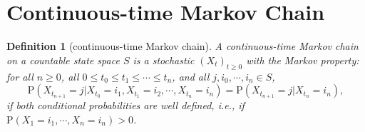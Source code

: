 \documentclass{report}
\newtheorem{definition}{Definition}[section]
\theoremstyle{nonumberplain}
\begin{document}
\section{Continuous-time Markov Chain}

\begin{definition}[continuous-time Markov chain]
	A \emph{continuous-time Markov chain} on a countable state space $S$ is a stochastic $(X_t)_{t\ge 0}$ with the Markov property: for all $ n\ge0$, all $0\le t_0\le t_1\le \cdots\le t_n$, and all	$j,i_0,\cdots,i_n\in S$,
	\[
	\mathrm{P}(X_{t_{n+1}}=j| X_{t_0}=i_{1},X_{t_1}=i_{2},\cdots,X_{t_n}=i_{n})=\mathrm{P}(X_{t_{n+1}}=j| X_{t_n}=i_{n}), 
	\] if both conditional probabilities are well defined, i.e., if $ 	\mathrm{P}(X_{1}=i_{1},\cdots ,X_{n}=i_{n})>0$.
\end{definition}
\end{document}
